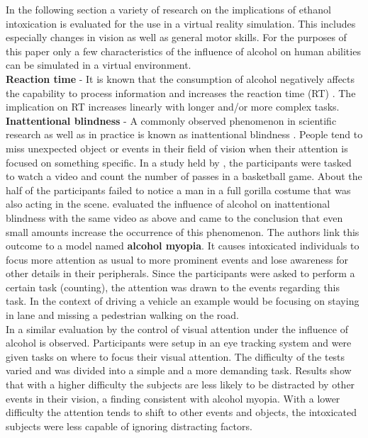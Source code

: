 In the following section a variety of research on the implications of ethanol intoxication is evaluated for the use in a virtual reality simulation. 
This includes especially changes in vision as well as general motor skills. 
For the purposes of this paper only a few characteristics of the influence of alcohol on human abilities can be simulated in a virtual environment. 
\\
\textbf{Reaction time} - It is known that the consumption of alcohol negatively affects the capability to process information and increases the reaction time (RT) \autocite[]{maylor1993alcohol}.
The implication on RT increases linearly with longer and/or more complex tasks.
\\
\textbf{Inattentional blindness} - A commonly observed phenomenon in scientific research as well as in practice is known as inattentional blindness \autocite[]{clifasefi2006blind}.
People tend to miss unexpected object or events in their field of vision when their attention is focused on something specific.
In a study held by \textcite{simons1999gorillas}, the participants were tasked to watch a video and count the number of passes in a basketball game. 
About the half of the participants failed to notice a man in a full gorilla costume that was also acting in the scene.
\textcite{clifasefi2006blind} evaluated the influence of alcohol on inattentional blindness with the same video as above and came to the conclusion that even small amounts increase the occurrence of this phenomenon. 
The authors link this outcome to a model named \textbf{alcohol myopia}.
It causes intoxicated individuals to focus more attention as usual to more prominent events and lose awareness for other details in their peripherals. \autocite{steele1990alcohol}
Since the participants were asked to perform a certain task (counting), the attention was drawn to the events regarding this task. 
In the context of driving a vehicle an example would be focusing on staying in lane and missing a pedestrian walking on the road.
\\
In a similar evaluation by \textcite{do2007effects} the control of visual attention under the influence of alcohol is observed. 
Participants were setup in an eye tracking system and were given tasks on where to focus their visual attention.
The difficulty of the tests varied and was divided into a simple and a more demanding task.
Results show that with a higher difficulty the subjects are less likely to be distracted by other events in their vision, a finding consistent with alcohol myopia. 
With a lower difficulty the attention tends to shift to other events and objects, the intoxicated subjects were less capable of ignoring distracting factors. 
